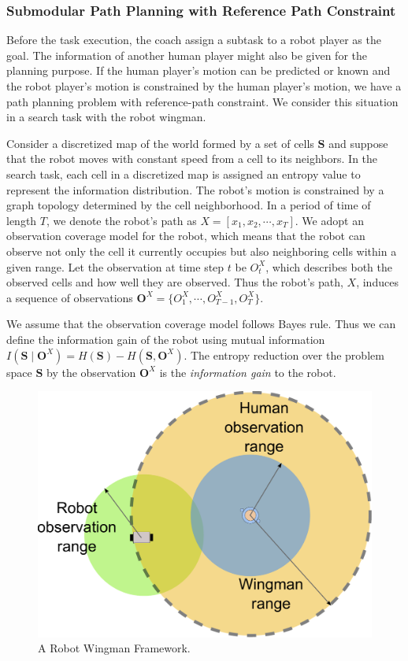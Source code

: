 \documentclass[phd]{byuprop}
\begin{document}
 

\subsubsection{Submodular Path Planning with Reference Path Constraint}
\label{sec:submodular_path_planning_with_reference_path_constraint}

Before the task execution, the coach assign a subtask to a robot player as the goal.
The information of another human player might also be given for the planning purpose.
If the human player's motion can be predicted or known and the robot player's motion is constrained by the human player's motion, we have a path planning problem with reference-path constraint.
We consider this situation in a search task with the robot wingman.

Consider a discretized map of the world formed by a set of cells $ \mathbf{S}$ and suppose that the robot moves with constant speed from a cell to its neighbors.
In the search task, each cell in a discretized map is assigned an entropy value to represent the information distribution.
The robot's motion is constrained by a graph topology determined by the cell neighborhood. 
In a period of time of length $ T $, we denote the robot's path as $ X = [x_{1}, x_{2} , \cdots , x_{T}] $.
We adopt an observation coverage model for the robot, which means that the robot can observe not only the cell it currently occupies but also neighboring cells within a given range.
Let the observation at time step $ t $ be $ O^{X}_{t} $, which describes both the observed cells and how well they are observed.
Thus the robot's path, $X$, induces a sequence of observations $ \mathbf{O}^{X} = \{ O^{X}_{1}, \cdots , O^{X}_{T-1}, O^{X}_{T} \}$.

We assume that the observation coverage model follows Bayes rule.
Thus we can define the information gain of the robot using mutual information $ I( \mathbf{S} \mid \mathbf{O}^{X} ) =  H( \mathbf{S} ) - H( \mathbf{S}, \mathbf{O}^{X}  ) $.
The entropy reduction over the problem space $ \mathbf{S} $ by the observation $ \mathbf{O}^{X} $ is the {\em information gain} to the robot.

\begin{figure}[hbtp]
\centering
\includegraphics[width=0.37\linewidth]{./fig/Wingman.pdf}
\caption{A Robot Wingman Framework.}
\label{fig:Wingman}
\end{figure}
\end{document}
